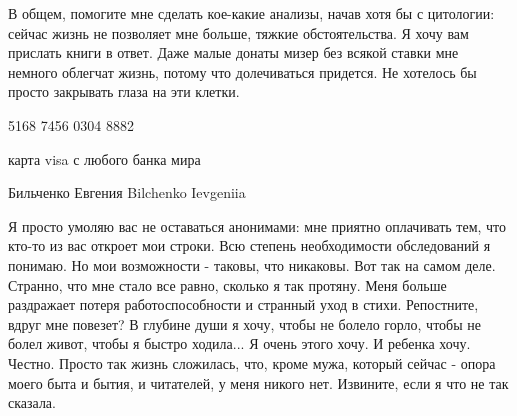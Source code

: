 В общем, помогите мне сделать кое-какие анализы, начав хотя бы с цитологии:
сейчас жизнь не позволяет мне больше, тяжкие обстоятельства. Я хочу вам
прислать книги в ответ. Даже малые донаты мизер без всякой ставки мне немного
облегчат жизнь, потому что долечиваться придется. Не хотелось бы просто
закрывать глаза на эти клетки. 

5168 7456 0304 8882 

карта visa с любого банка мира

Бильченко Евгения Bilchenko Ievgeniia

Я просто умоляю вас не оставаться анонимами: мне приятно оплачивать тем, что
кто-то из вас откроет мои строки. Всю степень необходимости обследований я
понимаю. Но мои возможности - таковы, что никаковы. Вот так на самом деле.
Странно, что мне стало все равно, сколько я так протяну. Меня больше раздражает
потеря работоспособности и странный уход в стихи. Репостните, вдруг мне
повезет? В глубине души я хочу, чтобы не болело горло, чтобы не болел живот,
чтобы я быстро ходила... Я очень этого хочу. И ребенка хочу. Честно. Просто так
жизнь сложилась, что, кроме мужа, который сейчас - опора моего быта и бытия, и
читателей, у меня никого нет. Извините, если я что не так сказала.
